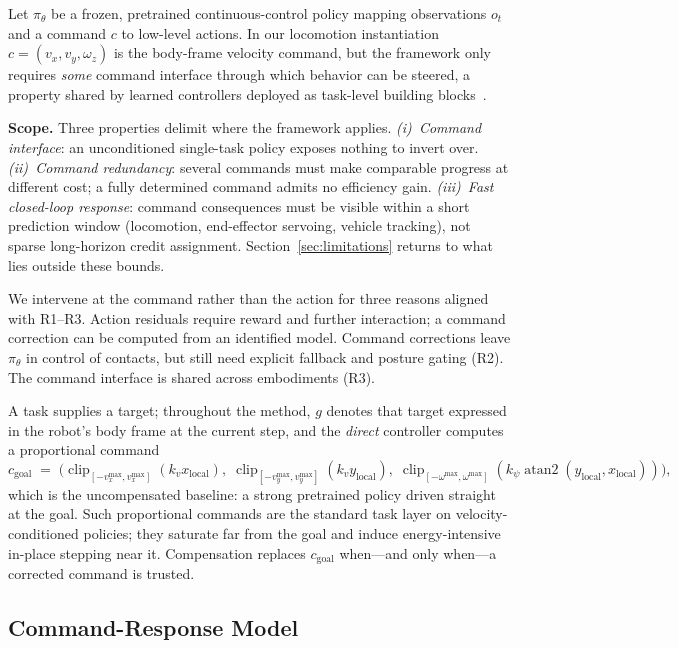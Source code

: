 \documentclass{article}
\begin{document}
Let $\pi_\theta$ be a frozen, pretrained continuous-control policy mapping
observations $o_t$ and a command $c$ to low-level actions.
In our locomotion instantiation $c = (v_x, v_y, \omega_z)$ is the body-frame
velocity command, but the framework only requires \emph{some} command interface
through which behavior can be steered, a property shared by learned controllers
deployed as task-level building blocks~\citep{margolis2022walk,kumar2021rma}.

\textbf{Scope.}
Three properties delimit where the framework applies.
\emph{(i)~Command interface}: an unconditioned single-task policy exposes nothing
to invert over.
\emph{(ii)~Command redundancy}: several commands must make comparable progress at
different cost; a fully determined command admits no efficiency gain.
\emph{(iii)~Fast closed-loop response}: command consequences must be visible within
a short prediction window (locomotion, end-effector servoing, vehicle tracking),
not sparse long-horizon credit assignment.
Section~\ref{sec:limitations} returns to what lies outside these bounds.

We intervene at the command rather than the action for three reasons aligned with
R1--R3. Action residuals require reward and further interaction; a command
correction can be computed from an identified model. Command corrections leave
$\pi_\theta$ in control of contacts, but still need explicit fallback and posture
gating (R2). The command interface is shared across embodiments (R3).

A task supplies a target; throughout the method, $g$ denotes that target expressed
in the robot's body frame at the current step, and the \emph{direct} controller
computes a proportional command
\begin{equation}
c_{\text{goal}} \;=\; \bigl(\operatorname{clip}_{[-v_x^{\max},v_x^{\max}]}(k_v x_{\text{local}}),\;
\operatorname{clip}_{[-v_y^{\max},v_y^{\max}]}(k_v y_{\text{local}}),\;
\operatorname{clip}_{[-\omega^{\max},\omega^{\max}]}(k_\psi \operatorname{atan2}(y_{\text{local}},x_{\text{local}}))\bigr),
\label{eq:cgoal}
\end{equation}
which is the uncompensated baseline: a strong pretrained policy driven straight at
the goal. Such proportional commands are the standard task layer on
velocity-conditioned policies; they saturate far from the goal and induce
energy-intensive in-place stepping near it. Compensation replaces
$c_{\text{goal}}$ when---and only when---a corrected command is trusted.

\subsection{Command-Response Model}
\label{sec:model}
\end{document}
